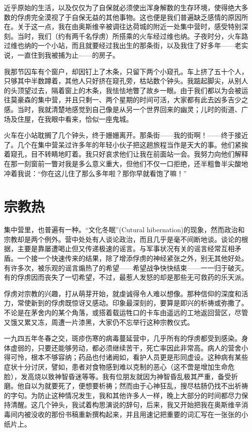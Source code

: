 \documentclass[11pt,oneside]{book}
\begin{document}
\begin{common-format}
近乎原始的生活，以及仅仅为了自保就必须使出浑身解数的生存环境，使得绝大多数的俘虏完全漠视了于自保无益的其他事物。这也便是我们普遍缺乏感情的原因所在。关于这一点，我在由奥斯维辛被调往达荷城的附近一处集中营时，感受特别深刻。当时，我们（约有两千名俘虏）所搭乘的火车经过维也纳。子夜时分，火车路过维也纳的一个小站，而且就要经过我出生的那条街，以及我住了好多年——老实说，一直住到我被捕为止——的房子。

我那节囚车有个窗户，却因钉上了木条，只留下两个小窥孔。车上挤了五十个人，只够其中半数蹲着，其他人只好挤在窥孔旁，枯站数个钟头。我踮起脚尖，从别人的头顶望过去，隔着窗上的木条，我怯怯地瞥了故乡一眼。由于我们都以为会被运往莫豪森的集中营，并且只剩一、两个星期的时间可活，大家都有此去凶多吉少之感。当时，我就清楚地感觉到自己像是从另一个世界回来的幽灵；儿时的街道、广场及住屋，在我眼中看来，恰似一座鬼城。

火车在小站耽搁了几个钟头，终于姗姗离开。那条街——我的街啊！——终于接近了。几个在集中营呆过许多年的年轻小伙子把这趟旅程当作是天大的事。他们紧挨着窥孔，目不转睛地盯着。我只好哀求他们让我在前面站一会。我努力向他们解释在那一刻窗前一瞥对我是多么意义重大，但他们不仅一口拒绝，还半粗鲁半尖酸地冲着我说：“你在这儿住了那么多年啦？那你早就看饱了嘛！”


\section{宗教热}
集中营里，也普遍有一种。“文化冬眠”(Cutural hibernation)的现象，然而政治和宗教却是两个例外。营中处处有人谈论政治，而且几乎是毫不间断地谈。谈论的根据，主要是靠屡遭喝止但又传递极速的谣言。与军事状况有关的谣言经常互相矛盾。一个接一个快速传来的结果，除了增添俘虏的神经紧张之外，别无其他好处。有许多次，被乐观的谣言煽热了的希望——希望战争快快结束——一一归于破灭。有的俘虏因而丧失了一切希望，不过，最惹人发怒的却是那些无可救药的乐天派。

俘虏对宗教的兴趣，打从萌芽开始，就虔诚得令人难以想像。那种信仰的深度和活力，常使新到的俘虏既惊讶又感动。印象最深刻的，要算是即兴的析祷或弥撒了。不论是在茅舍内的某个角落，或搭着载运牲口的卡车由遥远的工地返回营区，尽管又饿又累又冻，周遭一片漆黑，大家仍不忘举行这种宗教仪式。

一九四五年冬春之交，斑疹伤寒的病毒蔓延营中，几乎所有的俘虏都受到感染。身体虚弱的，只要还能够劳动，都必须继续苦干，死亡率因此非常高。病人的营舍小得可怜，根本不够容纳；药品也付诸阙如，看护人员更是形同虚设。这种病有某些症状十分讨厌，譬如，患者对食物感到难以克制的恶心（这不啻是增加生命危脸），发高烧以致神智昏迷等等。我有位朋友就因为神智昏乱极其严重，备受折磨。他自以为就要死了，便想要析祷；然而由于心神狂乱，搜尽枯肠仍找不出祈祷的字句。为防止这种情况发生，我和其他许多人一样，晚上大部分的时间都尽力保持清醒。这几个钟头，我试着构思演说的辞句，后来，我又开始把我在奥斯维辛消毒间内被没收的那份书稿重新撰构起来，并且用速记把重要的词汇写在一张张的小纸片上。


\end{common-format}
\end{document}

